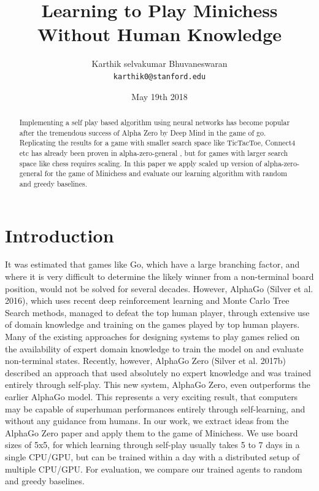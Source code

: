 \documentclass[11pt]{article}
\title{Learning to Play Minichess Without Human Knowledge}
\author{
  { Karthik selvakumar Bhuvaneswaran} \\
  {\tt karthik0@stanford.edu}
}
\date{May 19th 2018}
\begin{document}
\maketitle
\begin{abstract}

Implementing a self play based algorithm using neural networks has become popular after the tremendous success of Alpha Zero by Deep Mind in the game of go. Replicating the results for a game with smaller search space like TicTacToe, Connect4 etc has already been proven in alpha-zero-general \cite{alphazerogeneral}, but for games with larger search space like chess requires scaling.
In this paper we apply scaled up version of alpha-zero-general for the game of Minichess and evaluate our learning algorithm with random and greedy baselines. 

\end{abstract}


\section{Introduction}

It was estimated that games like Go, which have a large branching factor, and where it is very difficult to determine the likely winner from a non-terminal board position, would not be solved for several decades. However, AlphaGo (Silver et al. 2016), which uses recent deep reinforcement learning and Monte Carlo Tree Search methods, managed to defeat the top human player, through extensive use of domain knowledge and training on the games played by top human players. Many of the existing approaches for designing systems to play games relied on the availability of expert domain knowledge to train the model on and evaluate non-terminal states. Recently, however, AlphaGo Zero (Silver et al. 2017b) described an approach that used absolutely no expert knowledge and was trained entirely through self-play. This new system, AlphaGo Zero, even outperforms the earlier AlphaGo model. This represents a very exciting result, that computers may be capable of superhuman performances entirely through self-learning, and without any guidance from humans. In our work, we extract ideas from the AlphaGo Zero paper and apply them to the game of Minichess. We use board sizes of 5x5, for which learning through self-play usually takes 5 to 7 days in a single CPU/GPU, but can be trained within a day with a distributed setup of multiple CPU/GPU. For evaluation, we compare our trained agents to random and greedy baselines.
\end{document}
